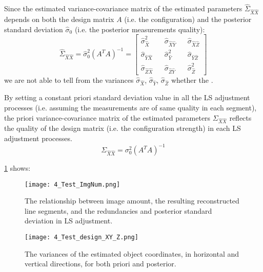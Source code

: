 Since the estimated variance-covariance matrix of the estimated parameters $\hat{\Sigma}_{\hat{X}\hat{X}}$ depends on both the design matrix $A$ (i.e. the configuration) and the posterior standard deviation $\hat{\sigma}_0$ (i.e. the posterior measurements quality):
\begin{equation}
\hat{\Sigma}_{\hat{X}\hat{X}}=\hat{\sigma}_0^2(A^TA)^{-1}=
\begin{bmatrix}
\hat{\sigma}_{\hat{X}}^2 && \hat{\sigma}_{\hat{X}\hat{Y}} && \hat{\sigma}_{\hat{X}\hat{Z}} \\
\hat{\sigma}_{\hat{Y}\hat{X}} && \hat{\sigma}_{\hat{Y}}^2 && \hat{\sigma}_{\hat{Y}\hat{Z}} \\
\hat{\sigma}_{\hat{Z}\hat{X}} && \hat{\sigma}_{\hat{Z}\hat{Y}} && \hat{\sigma}_{\hat{Z}}^2
\end{bmatrix}
\end{equation}
we are not able to tell from the variances $\hat{\sigma}_{\hat{X}}$, $\hat{\sigma}_{\hat{Y}}$, $\hat{\sigma}_{\hat{Z}}$ whether the .

By setting a constant priori standard deviation value in all the LS adjustment processes (i.e. assuming the measurements are of same quality in each segment), the priori variance-covariance matrix of the estimated parameters $\Sigma_{\hat{X}\hat{X}}$ reflects the quality of the design matrix (i.e. the configuration strength) in each LS adjustment processes.
\begin{equation}
\Sigma_{\hat{X}\hat{X}}=\sigma_0^2(A^TA)^{-1}
\end{equation}

\cref{fig:TestdesignHV_1} shows:


\begin{figure}
  \centering
  \texttt{[image: 4\_Test\_ImgNum.png]} %
  \caption{\small The relationship between image amount, the resulting reconstructed line segments, and the redundancies and posterior standard deviation in LS adjustment.}
  \label{fig:TestImgNum_1}
  \vspace{1cm}
  \texttt{[image: 4\_Test\_design\_XY\_Z.png]} %
  \caption{\small The variances of the estimated object coordinates, in horizontal and vertical directions, for both priori and posterior.}
  \label{fig:TestdesignHV_1}
\end{figure}


\clearpage





